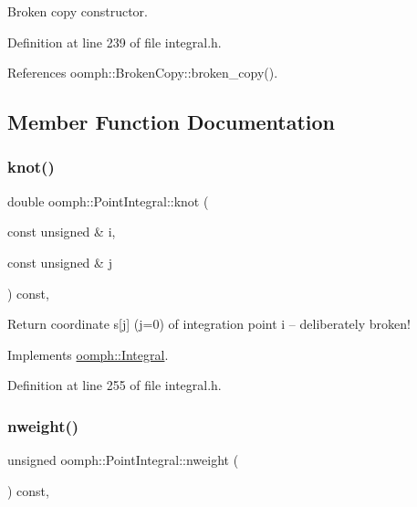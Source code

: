 Broken copy constructor. 



Definition at line 239 of file integral.\+h.



References oomph\+::\+Broken\+Copy\+::broken\+\_\+copy().



\subsection{Member Function Documentation}
\mbox{\label{classoomph_1_1PointIntegral_a0500dd69b4cfdd2539e2cefb82acb7cf}} 
\subsubsection{\texorpdfstring{knot()}{knot()}}
{\footnotesize\ttfamily double oomph\+::\+Point\+Integral\+::knot (\begin{DoxyParamCaption}\item[{const unsigned \&}]{i,  }\item[{const unsigned \&}]{j }\end{DoxyParamCaption}) const\hspace{0.3cm}{\ttfamily [inline]}, {\ttfamily [virtual]}}



Return coordinate s\mbox{[}j\mbox{]} (j=0) of integration point i -- deliberately broken! 



Implements \hyperlink{classoomph_1_1Integral_a1a2122f99a87c18649bafdd9ed739758}{oomph\+::\+Integral}.



Definition at line 255 of file integral.\+h.

\mbox{\label{classoomph_1_1PointIntegral_a198be650fefe8cd6bdf50bb848c3896e}} 
\subsubsection{\texorpdfstring{nweight()}{nweight()}}
{\footnotesize\ttfamily unsigned oomph\+::\+Point\+Integral\+::nweight (\begin{DoxyParamCaption}{ }\end{DoxyParamCaption}) const\hspace{0.3cm}{\ttfamily [inline]}, {\ttfamily [virtual]}}



